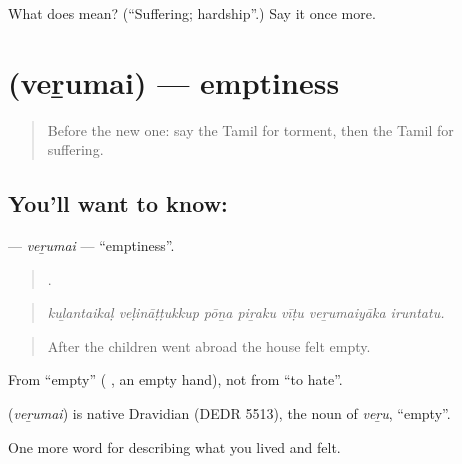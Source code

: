 \begin{tcolorbox}[breakable,colback=teal!4,colframe=teal!35!black,title={Before you move on}]
What does  mean? (\textquotedblleft{}Suffering; hardship\textquotedblright{}.) Say it once more.
\end{tcolorbox}
\section[\texorpdfstring{\ta{வெறுமை} (veṟumai)}{வெறுமை (veṟumai)}]{ (veṟumai) — emptiness}

\label{lesson:TA-C463-verumai}



\begin{quote}
Before the new one: say the Tamil for torment, then the Tamil for suffering.
\end{quote}

\subsection*{You'll want to know: }
\textbf{} — \emph{veṟumai} — \textquotedblleft{}emptiness\textquotedblright{}.

\begin{quote}
      .
\end{quote}

\begin{quote}
\emph{kuḻantaikaḷ veḷināṭṭukkup pōṉa piṟaku vīṭu veṟumaiyāka iruntatu.}
\end{quote}

\begin{quote}
After the children went abroad the house felt empty.
\end{quote}

From  \textquotedblleft{}empty\textquotedblright{} ( , an empty hand), not from  \textquotedblleft{}to hate\textquotedblright{}.

\begin{cousinweb}
\textbf{} (\emph{veṟumai}) is native Dravidian (DEDR 5513), the noun of  \emph{veṟu}, \textquotedblleft{}empty\textquotedblright{}.
\end{cousinweb}

\begin{grammarlens}[title={What you've built}]
One more word for describing what you lived and felt.
\end{grammarlens}

